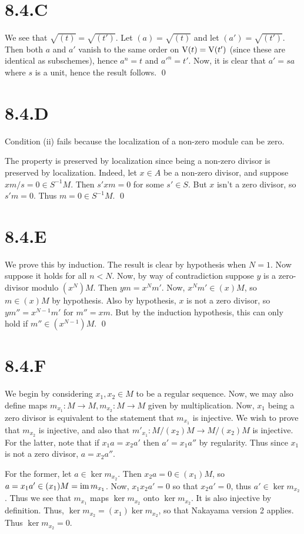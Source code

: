 \documentclass{article}
\begin{document}
\section{8.4.C}
We see that $\sqrt{(t)}=\sqrt{(t')}$. Let $(a)=\sqrt{(t)}$ and let
$(a')=\sqrt{(t')}$. Then both $a$ and
$a'$ vanish to the same order on $\operatorname{V}(t)=\operatorname{V}(t')$
(since these are identical as subschemes), hence $a^n=t$ and
$a'^n=t'$. Now, it is clear that $a'=sa$ where
$s$ is a unit, hence the result follows. \qed

\section{8.4.D}
Condition (ii) fails because the localization of a non-zero module can be zero.

The property is preserved by localization since being a non-zero divisor is
preserved by localization. Indeed, let $x \in A$ be a non-zero
divisor, and suppose $xm/s=0 \in S^{-1}M$. Then $s'xm=0$ for
some $s' \in S$. But $x$ isn't a zero divisor,
so $s'm=0$. Thus $m=0 \in S^{-1}M$. \qed

\section{8.4.E}
We prove this by induction. The result is clear by hypothesis when
$N=1$. Now suppose it holds for all $n<N$.
Now, by way of contradiction suppose $y$ is a zero-divisor
modulo $(x^N)M$. Then $ym=x^Nm'$. Now,
$x^Nm' \in (x)M$, so $m \in (x)M$ by hypothesis. Also by
hypothesis, $x$ is not a zero divisor, so
$ym''=x^{N-1}m'$ for $m''=xm$. But by the induction
hypothesis, this can only hold if $m'' \in (x^{N-1})M$. \qed

\section{8.4.F}
We begin by considering $x_1, x_2 \in M$ to be a regular sequence. Now,
we may also define maps $m_{x_1}: M \to M, m_{x_2}: M \to
    M$ given by multiplication. Now,
$x_1$ being a zero divisor is equivalent to the statement
that $m_{x_1}$ is injective. We wish to prove that
$m_{x_2}$ is injective, and also that $m'_{x_1}: M/(x_2)M \to M/(x_2)M$ is
injective. For the latter, note that if $x_1a=x_2a'$ then
$a'=x_1a''$ by regularity. Thus since $x_1$ is
not a zero divisor, $a=x_2a''$.

For the former, let $a \in \ker m_{x_2}$. Then $x_2a=0 \in (x_1)M$, so
$a = x_1a' \in (x_1)M = \operatorname{im} m_{x_1}$. Now, $x_1x_2a'=0$ so that
$x_2a'=0$, thus $a' \in \ker m_{x_2}$. Thus we see that
$m_{x_1}$ maps $\ker m_{x_2}$ onto
$\ker m_{x_2}$. It is also injective by definition. Thus,
$\ker m_{x_2}=(x_1)\ker m_{x_2}$, so that Nakayama version 2 applies. Thus
$\ker m_{x_2}=0$.
\end{document}
